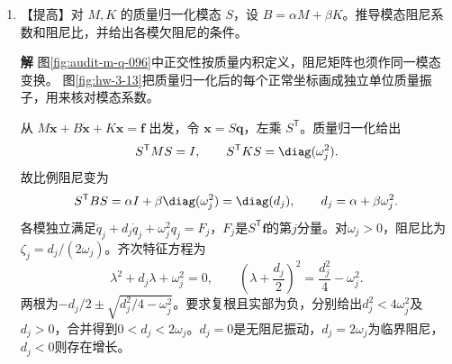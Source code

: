 \documentclass[11pt,openany,fontset=fandol]{ctexbook}
\theoremstyle{plain}\newtheorem{theorem}{定理}[chapter]\newtheorem{proposition}[theorem]{命题}
\theoremstyle{definition}\newtheorem{definition}{定义}[chapter]\newtheorem{example}{例}[chapter]
\theoremstyle{remark}\newtheorem*{remark}{说明}
\newcommand{\SolutionStart}{\par\nobreak\medskip\nobreak\noindent\textbf{解}\quad\ignorespaces}
\newenvironment{solution}{\SolutionStart}{\par\medskip}
\newcommand{\vct}[1]{\bm{#1}}\newcommand{\Rea}{\operatorname{Re}}\newcommand{\Ima}{\operatorname{Im}}
\begin{document}
\begin{enumerate}[label=3.\arabic*]
\begin{solution}
\begin{figure}[H]\centering
{}
\caption{题3.12：驱动力改作用于第二物体，连接方式与位移正方向保持不变。}\label{fig:ex-3-12}
\end{figure}

\end{solution}

\item \begin{minipage}[t]{\linewidth}
【提高】对 $M,K$ 的质量归一化模态 $S$，设 $B=\alpha M+\beta K$。推导模态阻尼系数和阻尼比，并给出各模欠阻尼的条件。
\end{minipage}

\begin{solution}
图\ref{fig:audit-m-q-096}中正交性按质量内积定义，阻尼矩阵也须作同一模态变换。
图\ref{fig:hw-3-13}把质量归一化后的每个正常坐标画成独立单位质量振子，用来核对模态系数。

从 $M\ddot{\vct x}+B\dot{\vct x}+K\vct x=\vct f$ 出发，令 $\vct x=S\vct q$，左乘 $S^{\mathsf T}$。质量归一化给出
\[
S^{\mathsf T}MS=I,\qquad
S^{\mathsf T}KS=\diag(\omega_j^2).
\]
故比例阻尼变为
\[
S^{\mathsf T}BS=\alpha I+\beta\diag(\omega_j^2)
=\diag(d_j),\qquad d_j=\alpha+\beta\omega_j^2.
\]
各模独立满足$\ddot q_j+d_j\dot q_j+\omega_j^2q_j=F_j$，$F_j$是$S^{\mathsf T}\vct f$的第$j$分量。对$\omega_j>0$，阻尼比为$\zeta_j=d_j/(2\omega_j)$。齐次特征方程为
\[\lambda^2+d_j\lambda+\omega_j^2=0,
\qquad\left(\lambda+\frac{d_j}{2}\right)^2
=\frac{d_j^2}{4}-\omega_j^2.\]
两根为$-d_j/2\pm\sqrt{d_j^2/4-\omega_j^2}$。要求复根且实部为负，分别给出$d_j^2<4\omega_j^2$及$d_j>0$，合并得到$0<d_j<2\omega_j$。$d_j=0$是无阻尼振动，$d_j=2\omega_j$为临界阻尼，$d_j<0$则存在增长。


\end{solution}
\end{enumerate}
\end{document}
